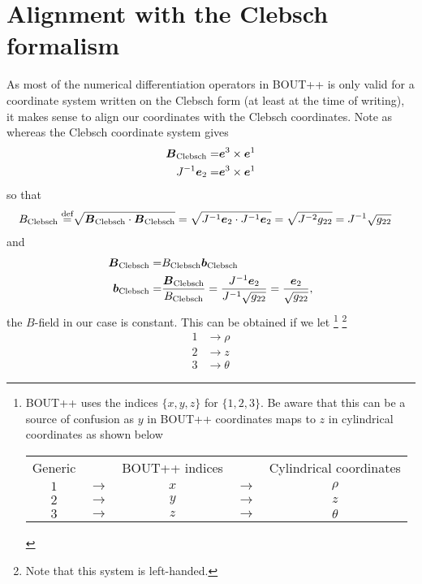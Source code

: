\section{Alignment with the Clebsch formalism}
\label{sec:clebschAlign}
%
As most of the numerical differentiation operators in BOUT++ is only valid for a coordinate system written on the Clebsch form (at least at the time of writing), it makes sense to align our coordinates with the Clebsch coordinates.
Note as whereas the Clebsch coordinate system gives
%
\begin{align*}
    \boldsymbol{B}_{\text{Clebsch}}
    =&\boldsymbol{e}^3 \times \boldsymbol{e}^1\\
    J^{-1}\boldsymbol{e}_2=&\boldsymbol{e}^3 \times \boldsymbol{e}^1
\end{align*}
%
so that
%
\begin{align*}
    B_{\text{Clebsch}}\overset{\text{def}}{=} & \sqrt{\boldsymbol{B}_{\text{Clebsch}}\cdot\boldsymbol{B}_{\text{Clebsch}}}
    = \sqrt{J^{-1}\boldsymbol{e}_2\cdot J^{-1}\boldsymbol{e}_2}
    = \sqrt{J^{-2}g_{22}}
    = J^{-1}\sqrt{g_{22}}
\end{align*}
%
and
%
\begin{align*}
    \boldsymbol{B}_{\text{Clebsch}}=&B_{\text{Clebsch}}\boldsymbol{b}_{\text{Clebsch}}\\
    \boldsymbol{b}_{\text{Clebsch}}
    =&\frac{\boldsymbol{B}_{\text{Clebsch}}}{B_{\text{Clebsch}}}
    =\frac{J^{-1}\boldsymbol{e}_2}{J^{-1}\sqrt{g_{22}}}
    =\frac{\boldsymbol{e}_2}{\sqrt{g_{22}}},
\end{align*}
%
the $B$-field in our case is constant. This can be obtained if we let%
%
\footnote{
    BOUT++ uses the indices $\{x,y,z\}$ for $\{1,2,3\}$.
    Be aware that this can be a source of confusion as $y$ in BOUT++ coordinates maps to $z$ in cylindrical coordinates as shown below
    \begin{center}
        \begin{tabular}{ccccc}
            Generic &     & BOUT++ indices &     & Cylindrical coordinates\\
            $1$     &$\to$& $x$            &$\to$& $\rho$                 \\
            $2$     &$\to$& $y$            &$\to$& $z$                    \\
            $3$     &$\to$& $z$            &$\to$& $\theta$
        \end{tabular}
    \end{center}
}%
%
\footnote{
    Note that this system is left-handed.
}
%
\begin{align*}
    1 &\to \rho\\
    2 &\to z\\
    3 &\to \theta
\end{align*}
